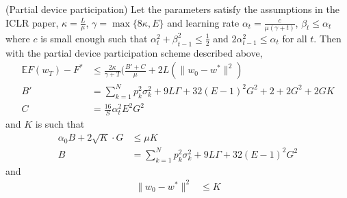 \begin{theorem}
	(Partial device participation) Let the parameters satisfy the assumptions
	in the ICLR paper, $\kappa=\frac{L}{\mu}$, $\gamma=\max\{8\kappa,E\}$
	and learning rate $\alpha_{t}=\frac{c}{\mu(\gamma+t)}$, $\beta_{t}\leq\alpha_{t}$
	where $c$ is small enough such that $\alpha_{t}^{2}+\beta_{t-1}^{2}\leq\frac{1}{2}$
	and $2\alpha_{t-1}^{2}\leq\alpha_{t}$ for all $t$. Then with the
	partial device participation scheme described above,
	\begin{align*}
	\mathbb{E}F(w_{T})-F^{\ast} & \leq\frac{2\kappa}{\gamma+T}(\frac{B'+C}{\mu}+2L(\|w_{0}-w^{\ast}\|^{2})\\
	B' & =\sum_{k=1}^{N}p_{k}^{2}\sigma_{k}^{2}+9L\Gamma+32(E-1)^{2}G^{2}+2+2G^{2}+2GK\\
	C & =\frac{16}{S}\alpha_{t}^{2}E^{2}G^{2}
	\end{align*}
	and $K$ is such that 
	\begin{align*}
	\alpha_{0}B+2\sqrt{K}\cdot G & \leq\mu K\\
	B & =\sum_{k=1}^{N}p_{k}^{2}\sigma_{k}^{2}+9L\Gamma+32(E-1)^{2}G^{2}
	\end{align*}
	and
	\begin{align*}
	\|w_{0}-w^{\ast}\|^{2} & \leq K
	\end{align*}
\end{theorem}
%
